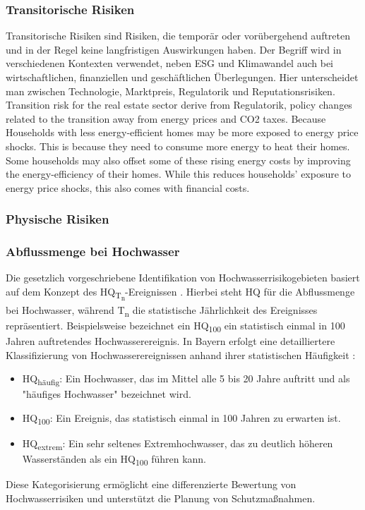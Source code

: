\subsubsection{Transitorische Risiken}
Transitorische Risiken sind Risiken, die temporär oder vorübergehend auftreten und in der Regel keine langfristigen Auswirkungen haben. Der Begriff wird in verschiedenen Kontexten verwendet, neben ESG und Klimawandel auch bei wirtschaftlichen, finanziellen und geschäftlichen Überlegungen. Hier unterscheidet man zwischen Technologie, Marktpreis, Regulatorik und Reputationsrisiken.  Transition risk for the real estate sector derive from  Regulatorik, policy changes related to the transition away from energy prices and CO2
taxes. 
Because Households with less energy-efficient homes may be more exposed to energy price shocks. This is because they need to consume more energy to heat their homes. Some households may also offset some of these rising energy costs by improving the energy-efficiency of their homes. While this reduces households’ exposure to energy price shocks, this also comes with financial costs.
\subsubsection{Physische Risiken}

\subsubsection{Abflussmenge bei Hochwasser}\label{sec:HQ}
Die gesetzlich vorgeschriebene Identifikation von Hochwasserrisikogebieten basiert auf dem Konzept des HQ\textsubscript{T\textsubscript{n}}-Ereignissen \autocite{WHG73}. Hierbei steht HQ für die Abflussmenge bei Hochwasser, während T\textsubscript{n} die statistische Jährlichkeit des Ereignisses repräsentiert. Beispielsweise bezeichnet ein HQ\textsubscript{100} ein statistisch einmal in 100 Jahren auftretendes Hochwasserereignis.
In Bayern erfolgt eine detailliertere Klassifizierung von Hochwasserereignissen anhand ihrer statistischen Häufigkeit \autocite{BayLfU2019}:
\begin{itemize}
\item HQ\textsubscript{häufig}: Ein Hochwasser, das im Mittel alle 5 bis 20 Jahre auftritt und als "häufiges Hochwasser" bezeichnet wird.
\item HQ\textsubscript{100}: Ein Ereignis, das statistisch einmal in 100 Jahren zu erwarten ist.
\item HQ\textsubscript{extrem}: Ein sehr seltenes Extremhochwasser, das zu deutlich höheren Wasserständen als ein HQ\textsubscript{100} führen kann.
\end{itemize}
Diese Kategorisierung ermöglicht eine differenzierte Bewertung von Hochwasserrisiken und unterstützt die Planung von Schutzmaßnahmen.
